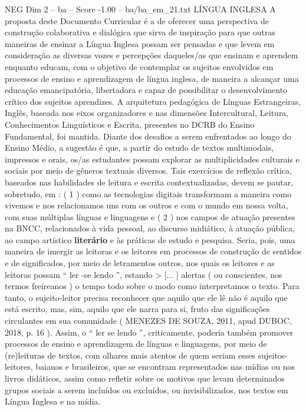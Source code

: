 \begin{textsample}{NEG Dim 2 – ba – Score -1.00 – ba/ba\_em\_21.txt}  \label{ex:f2_neg_252}
LÍNGUA INGLESA A proposta deste Documento Curricular é a de oferecer uma perspectiva de construção colaborativa e dialógica que sirva de inspiração para que outras maneiras de ensinar a Língua Inglesa possam ser pensadas e que levem em consideração as diversas vozes e percepções daqueles/as que ensinam e aprendem enquanto educam, com o objetivo de contemplar os sujeitos envolvidos em processos de ensino e aprendizagem de língua inglesa, de maneira a alcançar uma educação emancipatória, libertadora e capaz de possibilitar o desenvolvimento crítico dos sujeitos aprendizes.
A arquitetura pedagógica de Línguas Estrangeiras, Inglês, baseada nos eixos organizadores e nas dimensões Intercultural, Leitura, Conhecimentos Linguísticos e Escrita, presentes no DCRB do Ensino Fundamental, foi mantida.
Diante dos desafios a serem enfrentados ao longo do Ensino Médio, a sugestão é que, a partir do estudo de textos multimodais, impressos e orais, os/as estudantes possam explorar as multiplicidades culturais e sociais por meio de gêneros textuais diversos.
Tais exercícios de reflexão crítica, baseados nas habilidades de leitura e escrita contextualizadas, devem se pautar, sobretudo, em : ( 1 ) como as tecnologias digitais transformam a maneira como vivemos e nos relacionamos uns com os outros e com o mundo em nossa volta, com suas múltiplas línguas e linguagens e ( 2 ) nos campos de atuação presentes na BNCC, relacionados à vida pessoal, ao discurso midiático, à atuação pública, ao campo artístico \textbf{literário} e às práticas de estudo e pesquisa.
Seria, pois, uma maneira de imergir as leitoras e os leitores em processos de construção de sentidos e de significados, por meio de letramentos outros, nos quais os leitores e as leitoras possam “ ler -se lendo ”, estando > [... ] alertas ( ou conscientes, nos termos freireanos ) o tempo todo sobre o modo como interpretamos o texto.
Para tanto, o sujeito-leitor precisa reconhecer que aquilo que ele lê não é aquilo que está escrito, mas, sim, aquilo que ele narra para si, fruto das significações circulantes em sua comunidade ( MENEZES DE SOUZA, 2011, apud DUBOC, 2018, p. 16 ).
Assim, o “ ler se lendo ”, criticamente, poderia também promover processos de ensino e aprendizagem de línguas e linguagens, por meio de (re)leituras de textos, com olhares mais atentos de quem seriam esses sujeitos-leitores, baianos e brasileiros, que se encontram representados nas mídias ou nos livros didáticos, assim como refletir sobre os motivos que levam determinados grupos sociais a serem incluídos ou excluídos, ou invisibilizados, nos textos em Língua Inglesa e na mídia.

\end{textsample}
